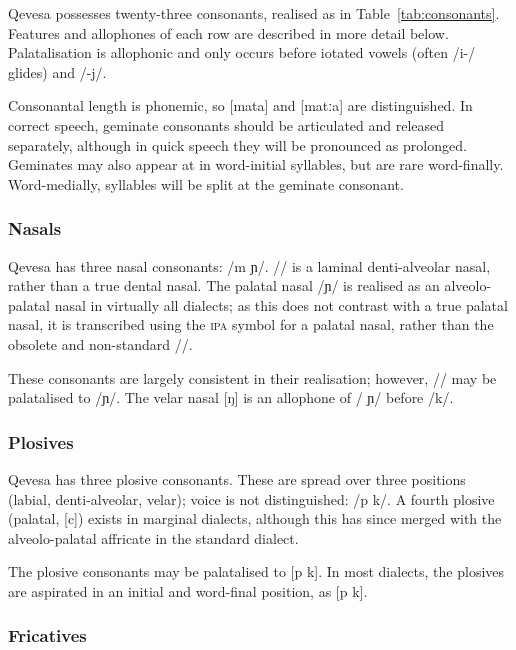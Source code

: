 \documentclass[grammar]{subfiles}
\begin{document}
	Qevesa possesses twenty-three consonants, realised as in Table~\ref{tab:consonants}. Features and allophones of each row are described in more detail below. Palatalisation is allophonic and only occurs before iotated vowels (often /i-/ glides) and /-j/.

	Consonantal length is phonemic, so [mata] and [matːa] are distinguished. In correct speech, geminate consonants should be articulated and released separately, although in quick speech they will be pronounced as prolonged. Geminates may also appear at in word-initial syllables, but are rare word-finally. Word-medially, syllables will be split at the geminate consonant.

	\subsubsection{Nasals}
	\label{sssec:nasals}

	Qevesa has three nasal consonants: /m  ɲ/. // is a laminal denti-alveolar nasal, rather than a true dental nasal. The palatal nasal /ɲ/ is realised as an alveolo-palatal nasal in virtually all dialects; as this does not contrast with a true palatal nasal, it is transcribed using the \textsc{ipa} symbol for a palatal nasal, rather than the obsolete and non-standard /\textctn/.

	These consonants are largely consistent in their realisation; however, // may be palatalised to /ɲ/. The velar nasal [ŋ] is an allophone of / ɲ/ before /k/.

	\subsubsection{Plosives}
	\label{sssec:plosives}

	Qevesa has three plosive consonants. These are spread over three positions (labial, denti-alveolar, velar); voice is not distinguished: /p  k/. A fourth plosive (palatal, [c]) exists in marginal dialects, although this has since merged with the alveolo-palatal affricate in the standard dialect.

	The plosive consonants may be palatalised to [p\superj{}  k\superj]. In most dialects, the plosives are aspirated in an initial and word-final position, as [p\superh{}  k\superh].

	\subsubsection{Fricatives}
	\label{sssec:fricatives}
\end{document}
